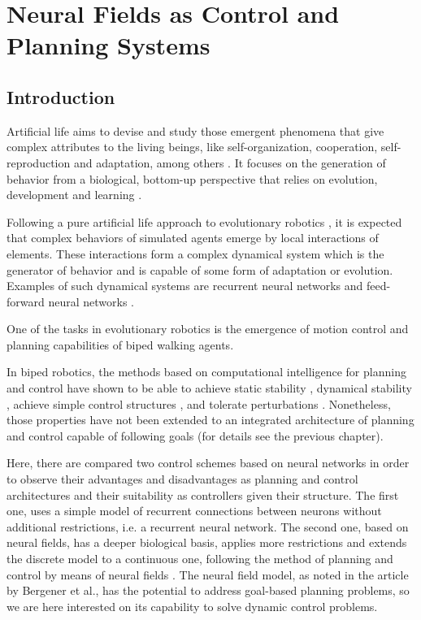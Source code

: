 \chapter{Neural Fields as Control and Planning Systems} 
\label{ch:chp2}
\section{Introduction}

Artificial life aims to devise and study those emergent phenomena that
give complex attributes to the living beings, like self-organization,
cooperation, self-reproduction and adaptation, among others
\cite{Bedau92Philosophical}. It focuses on the generation of behavior
from a biological, bottom-up perspective that relies on evolution,
development and learning \cite{Dyer94Toward}.

Following a pure artificial life approach to evolutionary robotics
\cite{Nolfi04Evolutionary}, it is expected that complex behaviors of
simulated agents emerge by local interactions of elements. These
interactions form a complex dynamical system which is the generator of
behavior and is capable of some form of adaptation or
evolution. Examples of such dynamical systems are recurrent neural
networks \cite{Huelse04Structure} and feed-forward neural networks
\cite{Stanley02Evolving}.

One of the tasks in evolutionary robotics is the emergence of motion
control and planning capabilities of biped walking agents.

In biped robotics, the methods based on computational intelligence for
planning and control have shown to be able to achieve static stability
\cite{Kun97Adaptive}, dynamical stability
\cite{Nakanishi2004b,Komatsu05Dynamic}, achieve simple control
structures \cite{Huelse04Structure}, and tolerate perturbations
\cite{Juang02Intelligent}. Nonetheless, those properties have not been
extended to an integrated architecture of planning and control capable
of following goals (for details see the previous chapter).

Here, there are compared two control schemes based on neural networks
in order to observe their advantages and disadvantages as planning and
control architectures and their suitability as controllers given their
structure. The first one, uses a simple model of recurrent connections
between neurons without additional restrictions, i.e. a recurrent
neural network. The second one, based on neural fields, has a deeper
biological basis, applies more restrictions and extends the discrete
model to a continuous one, following the method of planning and
control by means of neural fields \cite{Bergener99Complex}. The neural
field model, as noted in the article by Bergener et al., has the
potential to address goal-based planning problems, so we are here
interested on its capability to solve dynamic control problems.

